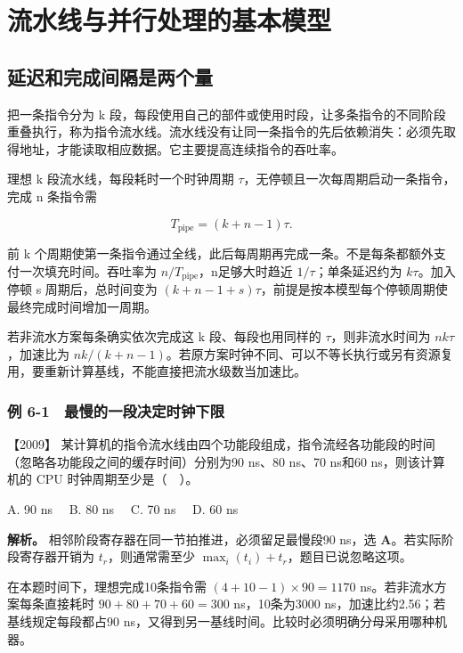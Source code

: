 \section{流水线与并行处理的基本模型}\label{co-ch6}

\subsection{延迟和完成间隔是两个量}\label{co-06-01}

把一条指令分为 k 段，每段使用自己的部件或使用时段，让多条指令的不同阶段重叠执行，称为指令流水线。流水线没有让同一条指令的先后依赖消失：必须先取得地址，才能读取相应数据。它主要提高连续指令的吞吐率。

理想 k 段流水线，每段耗时一个时钟周期 \(\tau\)，无停顿且一次每周期启动一条指令，完成 n 条指令需

\[
T_{\mathrm{pipe}}=(k+n-1)\tau.
\]

前 k 个周期使第一条指令通过全线，此后每周期再完成一条。不是每条都额外支付一次填充时间。吞吐率为 \(n/T_{\mathrm{pipe}}\)，n足够大时趋近 \(1/\tau\)；单条延迟约为 \(k\tau\)。加入停顿 s 周期后，总时间变为 \((k+n-1+s)\tau\)，前提是按本模型每个停顿周期使最终完成时间增加一周期。

若非流水方案每条确实依次完成这 k 段、每段也用同样的 \(\tau\)，则非流水时间为 \(nk\tau\)，加速比为 \(nk/(k+n-1)\)。若原方案时钟不同、可以不等长执行或另有资源复用，要重新计算基线，不能直接把流水级数当加速比。

\subsubsection{例 6-1　最慢的一段决定时钟下限}\label{co-ex6-1}

\noindent{}【2009】 某计算机的指令流水线由四个功能段组成，指令流经各功能段的时间（忽略各功能段之间的缓存时间）分别为90 ns、80 ns、70 ns和60 ns，则该计算机的 CPU 时钟周期至少是（　）。

A. 90 ns　 B. 80 ns　 C. 70 ns　 D. 60 ns


\textbf{解析。} 相邻阶段寄存器在同一节拍推进，必须留足最慢段90 ns，选 \textbf{A}。若实际阶段寄存器开销为 \(t_r\)，则通常需至少 \(\max_i(t_i)+t_r\)，题目已说忽略这项。

在本题时间下，理想完成10条指令需 \((4+10-1)\times90=1170\) ns。若非流水方案每条直接耗时 \(90+80+70+60=300\) ns，10条为3000 ns，加速比约2.56；若基线规定每段都占90 ns，又得到另一基线时间。比较时必须明确分母采用哪种机器。


